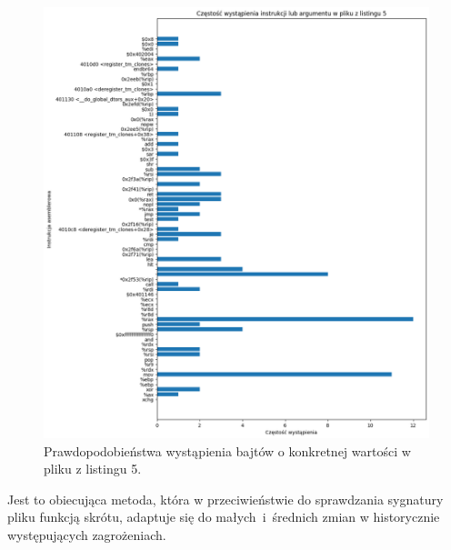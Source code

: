 \begin{figure}[H]
    \centering
    \includegraphics[width=0.69\linewidth]{rysunki/p2.png}
    \caption{Prawdopodobieństwa wystąpienia bajtów o konkretnej wartości w pliku z listingu 5.}
    \label{fig:enter-label}
\end{figure}
Jest to obiecująca metoda, która w przeciwieństwie do sprawdzania sygnatury pliku funkcją skrótu, adaptuje się do małych~i~średnich zmian w historycznie występujących zagrożeniach.
\afterpage{\blankpage}
